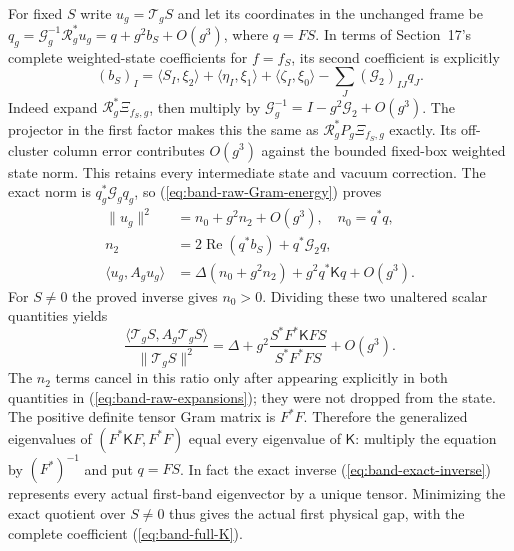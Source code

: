 For fixed $S$ write $u_g=\mathcal T_gS$ and let its coordinates in
the unchanged frame be
$q_g=\mathcal G_g^{-1}\mathcal R_g^*u_g=q+g^2b_S+O(g^3)$,
where $q=FS$. In terms of Section~17's complete weighted-state
coefficients for $f=f_S$, its second coefficient is explicitly
\[
 (b_S)_I=\langle S_I,\xi_2\rangle+\langle\eta_I,\xi_1\rangle
       +\langle\zeta_I,\xi_0\rangle
       -\sum_J(\mathcal G_2)_{IJ}q_J.
\]
Indeed expand $\mathcal R_g^*\Xi_{f_S,g}$, then multiply by
$\mathcal G_g^{-1}=I-g^2\mathcal G_2+O(g^3)$.
The projector in the first factor makes this the same as
$\mathcal R_g^*P_g\Xi_{f_S,g}$ exactly. Its off-cluster column
error contributes $O(g^3)$ against the bounded fixed-box weighted
state norm. This retains every intermediate state and vacuum correction.
The exact norm is $q_g^*\mathcal G_gq_g$, so (\ref{eq:band-raw-Gram-energy})
proves
\begin{align}
 \|u_g\|^2&=n_0+g^2n_2+O(g^3),\quad n_0=q^*q,\nonumber\\
 n_2&=2\operatorname{Re}(q^*b_S)+q^*\mathcal G_2q,\nonumber\\
 \langle u_g,A_gu_g\rangle
       &=\Delta(n_0+g^2n_2)+g^2q^*\mathsf Kq+O(g^3).
 \label{eq:band-raw-expansions}
\end{align}
For $S\ne0$ the proved inverse gives $n_0>0$. Dividing these two
unaltered scalar quantities yields
\begin{equation}\label{eq:band-tensor-Rayleigh}
 \frac{\langle\mathcal T_gS,A_g\mathcal T_gS\rangle}
      {\|\mathcal T_gS\|^2}
 =\Delta+g^2\frac{S^*F^*\mathsf KFS}{S^*F^*FS}+O(g^3).
\end{equation}
The $n_2$ terms cancel in this ratio only after appearing explicitly
in both quantities in (\ref{eq:band-raw-expansions}); they were not
dropped from the state. The positive definite tensor Gram matrix is
$F^*F$. Therefore the generalized eigenvalues of
$(F^*\mathsf KF,F^*F)$ equal every eigenvalue of $\mathsf K$:
multiply the equation by $(F^*)^{-1}$ and put $q=FS$.
In fact the exact inverse (\ref{eq:band-exact-inverse}) represents
every actual first-band eigenvector by a unique tensor. Minimizing
the exact quotient over $S\ne0$ thus gives the actual first physical
gap, with the complete coefficient (\ref{eq:band-full-K}).

